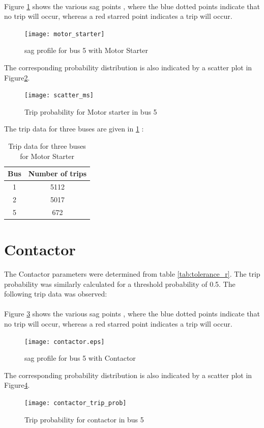 \documentclass[17pt,a4paper]{extreport}
\begin{document}
	 \paragraph{} Figure \ref{fig:ms_sag_5} shows the various sag points , where the blue dotted points indicate that no trip will occur, whereas a red starred point indicates a trip will occur.
	\begin{figure}[!h]
		\texttt{[image: motor\_starter]}
		\caption{sag profile for bus 5 with Motor Starter}
		\label{fig:ms_sag_5}
	\end{figure}
	The corresponding probability distribution is also indicated by a scatter plot in Figure\ref{fig:scatter_ms_5}.
	\begin{figure}[!h]
	\texttt{[image: scatter\_ms]}
	\caption{Trip probability for Motor starter in bus 5}
	\label{fig:scatter_ms_5}
\end{figure}	
The trip data for three buses are given in \ref{tab:ms_res} :
 \begin{center}
 \begin{table}
 \centering
 \begin{tabular}{|c|c|}
 \hline 
 Bus & Number of trips \\ \hline
 1 & 5112 \\ \hline
 2 & 5017 \\ \hline
 5 & 672	\\ \hline
 
 \end{tabular}
  \caption{Trip data for three buses for Motor Starter}
 \label{tab:ms_res}
 \end{table}

 \end{center}
 
 \section[Contactor]{Contactor}
 The Contactor parameters were determined from table \ref{tab:tolerance_r}. The trip probability was similarly calculated for a threshold probability of 0.5. The following trip data was observed: 
	 \paragraph{} Figure \ref{fig:con_sag_5} shows the various sag points , where the blue dotted points indicate that no trip will occur, whereas a red starred point indicates a trip will occur.
	\begin{figure}[!h]
		\texttt{[image: contactor.eps]}
		\caption{sag profile for bus 5 with Contactor}
		\label{fig:con_sag_5}
	\end{figure}
	The corresponding probability distribution is also indicated by a scatter plot in Figure\ref{fig:scatter_con_5}.
	\begin{figure}[!h]
	\texttt{[image: contactor\_trip\_prob]}
	\caption{Trip probability for contactor in bus 5}
	\label{fig:scatter_con_5}
\end{figure}	
\end{document}
